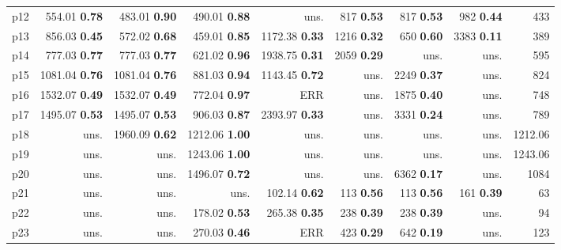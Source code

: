 \begin{tabular}{|l|rrrrrrr|r|}
p12 & {\footnotesize 554.01} \textbf{0.78} & {\footnotesize 483.01} \textbf{0.90} & {\footnotesize 490.01} \textbf{0.88} & uns. & {\footnotesize 817} \textbf{0.53} & {\footnotesize 817} \textbf{0.53} & {\footnotesize 982} \textbf{0.44} & 433\\
p13 & {\footnotesize 856.03} \textbf{0.45} & {\footnotesize 572.02} \textbf{0.68} & {\footnotesize 459.01} \textbf{0.85} & {\footnotesize 1172.38} \textbf{0.33} & {\footnotesize 1216} \textbf{0.32} & {\footnotesize 650} \textbf{0.60} & {\footnotesize 3383} \textbf{0.11} & 389\\
p14 & {\footnotesize 777.03} \textbf{0.77} & {\footnotesize 777.03} \textbf{0.77} & {\footnotesize 621.02} \textbf{0.96} & {\footnotesize 1938.75} \textbf{0.31} & {\footnotesize 2059} \textbf{0.29} & uns. & uns. & 595\\
p15 & {\footnotesize 1081.04} \textbf{0.76} & {\footnotesize 1081.04} \textbf{0.76} & {\footnotesize 881.03} \textbf{0.94} & {\footnotesize 1143.45} \textbf{0.72} & uns. & {\footnotesize 2249} \textbf{0.37} & uns. & 824\\
p16 & {\footnotesize 1532.07} \textbf{0.49} & {\footnotesize 1532.07} \textbf{0.49} & {\footnotesize 772.04} \textbf{0.97} & ERR & uns. & {\footnotesize 1875} \textbf{0.40} & uns. & 748\\
p17 & {\footnotesize 1495.07} \textbf{0.53} & {\footnotesize 1495.07} \textbf{0.53} & {\footnotesize 906.03} \textbf{0.87} & {\footnotesize 2393.97} \textbf{0.33} & uns. & {\footnotesize 3331} \textbf{0.24} & uns. & 789\\
p18 & uns. & {\footnotesize 1960.09} \textbf{0.62} & {\footnotesize 1212.06} \textbf{1.00} & uns. & uns. & uns. & uns. & 1212.06\\
p19 & uns. & uns. & {\footnotesize 1243.06} \textbf{1.00} & uns. & uns. & uns. & uns. & 1243.06\\
p20 & uns. & uns. & {\footnotesize 1496.07} \textbf{0.72} & uns. & uns. & {\footnotesize 6362} \textbf{0.17} & uns. & 1084\\
p21 & uns. & uns. & uns. & {\footnotesize 102.14} \textbf{0.62} & {\footnotesize 113} \textbf{0.56} & {\footnotesize 113} \textbf{0.56} & {\footnotesize 161} \textbf{0.39} & 63\\
p22 & uns. & uns. & {\footnotesize 178.02} \textbf{0.53} & {\footnotesize 265.38} \textbf{0.35} & {\footnotesize 238} \textbf{0.39} & {\footnotesize 238} \textbf{0.39} & uns. & 94\\
p23 & uns. & uns. & {\footnotesize 270.03} \textbf{0.46} & ERR & {\footnotesize 423} \textbf{0.29} & {\footnotesize 642} \textbf{0.19} & uns. & 123\\

\end{tabular}

